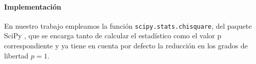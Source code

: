 \paragraph{Implementación}
En nuestro trabajo empleamos la función \texttt{scipy.stats.chisquare}, del paquete SciPy \cite{scipy2022chisquare}, que se encarga tanto de calcular el estadístico como el valor p correspondiente y ya tiene en cuenta por defecto la reducción en los grados de libertad $p = 1$.
